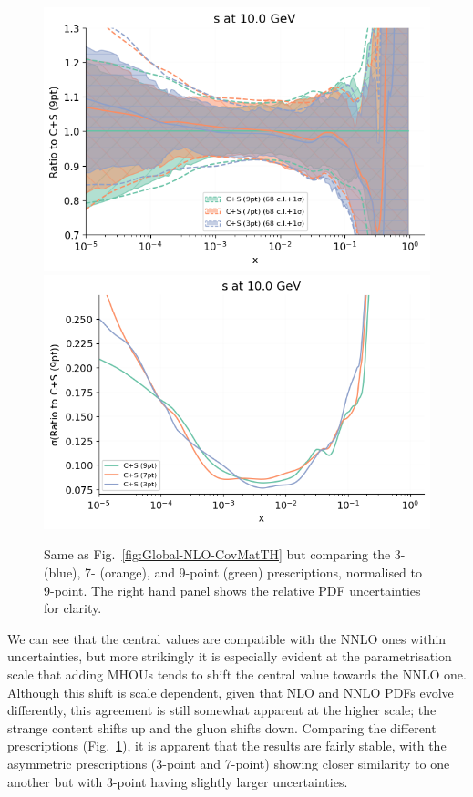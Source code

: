 \begin{figure}[H]
\begin{center}
       \includegraphics[scale=0.44]{mhous/plots/jplots/j2s.png}
    \includegraphics[scale=0.45]{mhous/plots/jplots/jes.png}
   \caption{\small Same as Fig.~\ref{fig:Global-NLO-CovMatTH} but comparing the 3- (blue), 7- (orange), and 9-point (green) prescriptions, normalised
     to 9-point. The right hand panel shows the 
     relative PDF uncertainties for clarity.
    \label{fig:Global-NLO-CovMatTH-prescriptions} }
  \end{center}
\end{figure}
We can see that the central values are compatible with the NNLO ones within uncertainties, but more strikingly it is especially evident at the parametrisation scale that adding MHOUs tends to shift the central value towards the NNLO one. Although this shift is scale dependent, given that NLO and NNLO PDFs evolve differently, this agreement is still somewhat apparent at the higher scale; the strange content shifts up and the gluon shifts down. 
%
Comparing the different prescriptions (Fig.~\ref{fig:Global-NLO-CovMatTH-prescriptions}), it is apparent that the results are fairly stable, with the asymmetric prescriptions (3-point and 7-point) showing closer similarity to one another but with 3-point having slightly larger uncertainties.

